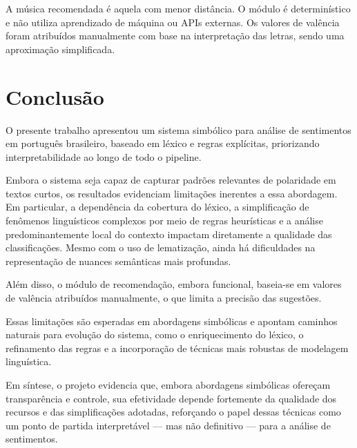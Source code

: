 \documentclass[11pt,a4paper]{article}
\begin{document}
A música recomendada é aquela com menor distância. O módulo é determinístico e não utiliza aprendizado de máquina ou APIs externas. Os valores de valência foram atribuídos manualmente com base na interpretação das letras, sendo uma aproximação simplificada.

\section{Conclusão}

O presente trabalho apresentou um sistema simbólico para análise de sentimentos em português brasileiro, baseado em léxico e regras explícitas, priorizando interpretabilidade ao longo de todo o pipeline.

Embora o sistema seja capaz de capturar padrões relevantes de polaridade em textos curtos, os resultados evidenciam limitações inerentes a essa abordagem. Em particular, a dependência da cobertura do léxico, a simplificação de fenômenos linguísticos complexos por meio de regras heurísticas e a análise predominantemente local do contexto impactam diretamente a qualidade das classificações. Mesmo com o uso de lematização, ainda há dificuldades na representação de nuances semânticas mais profundas.

Além disso, o módulo de recomendação, embora funcional, baseia-se em valores de valência atribuídos manualmente, o que limita a precisão das sugestões.

Essas limitações são esperadas em abordagens simbólicas e apontam caminhos naturais para evolução do sistema, como o enriquecimento do léxico, o refinamento das regras e a incorporação de técnicas mais robustas de modelagem linguística.

Em síntese, o projeto evidencia que, embora abordagens simbólicas ofereçam transparência e controle, sua efetividade depende fortemente da qualidade dos recursos e das simplificações adotadas, reforçando o papel dessas técnicas como um ponto de partida interpretável — mas não definitivo — para a análise de sentimentos.



\end{document}
